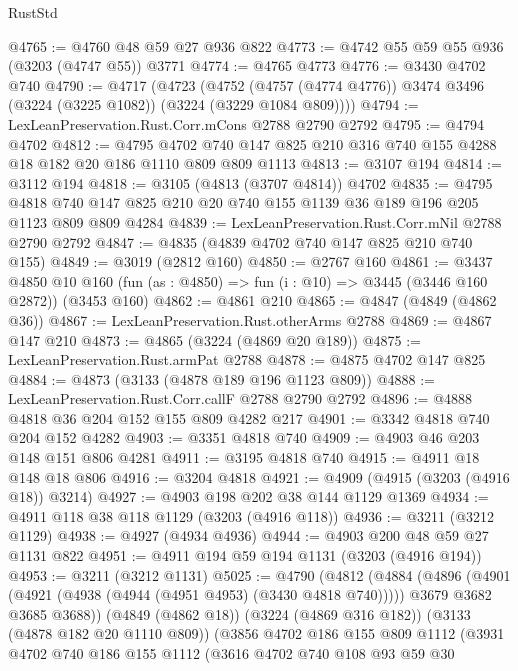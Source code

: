 \begin{lexlean}{RustStd}
\begin{coremodule}
@4765 := @4760 @48 @59 @27 @936 @822
@4773 := @4742 @55 @59 @55 @936 (@3203 (@4747 @55)) @3771
@4774 := @4765 @4773
@4776 := @3430 @4702 @740
@4790 := @4717
    (@4723
      (@4752 (@4757 (@4774 @4776)) @3474 @3496 (@3224 (@3225 @1082)) (@3224 (@3229 @1084 @809))))
@4794 := LexLeanPreservation.Rust.Corr.mCons @2788 @2790 @2792
@4795 := @4794 @4702
@4812 := @4795
    @4702
    @740
    @147
    @825
    @210
    @316
    @740
    @155
    @4288
    @18
    @182
    @20
    @186
    @1110
    @809
    @809
    @1113
@4813 := @3107 @194
@4814 := @3112 @194
@4818 := @3105 (@4813 (@3707 @4814)) @4702
@4835 := @4795
    @4818
    @740
    @147
    @825
    @210
    @20
    @740
    @155
    @1139
    @36
    @189
    @196
    @205
    @1123
    @809
    @809
    @4284
@4839 := LexLeanPreservation.Rust.Corr.mNil @2788 @2790 @2792
@4847 := @4835 (@4839 @4702 @740 @147 @825 @210 @740 @155)
@4849 := @3019 (@2812 @160)
@4850 := @2767 @160
@4861 := @3437
    @4850
    @10
    @160
    (fun (as : @4850) => fun (i : @10) => @3445 (@3446 @160 @2872))
    (@3453 @160)
@4862 := @4861 @210
@4865 := @4847 (@4849 (@4862 @36))
@4867 := LexLeanPreservation.Rust.otherArms @2788
@4869 := @4867 @147 @210
@4873 := @4865 (@3224 (@4869 @20 @189))
@4875 := LexLeanPreservation.Rust.armPat @2788
@4878 := @4875 @4702 @147 @825
@4884 := @4873 (@3133 (@4878 @189 @196 @1123 @809))
@4888 := LexLeanPreservation.Rust.Corr.callF @2788 @2790 @2792
@4896 := @4888 @4818 @36 @204 @152 @155 @809 @4282 @217
@4901 := @3342 @4818 @740 @204 @152 @4282
@4903 := @3351 @4818 @740
@4909 := @4903 @46 @203 @148 @151 @806 @4281
@4911 := @3195 @4818 @740
@4915 := @4911 @18 @148 @18 @806
@4916 := @3204 @4818
@4921 := @4909 (@4915 (@3203 (@4916 @18)) @3214)
@4927 := @4903 @198 @202 @38 @144 @1129 @1369
@4934 := @4911 @118 @38 @118 @1129 (@3203 (@4916 @118))
@4936 := @3211 (@3212 @1129)
@4938 := @4927 (@4934 @4936)
@4944 := @4903 @200 @48 @59 @27 @1131 @822
@4951 := @4911 @194 @59 @194 @1131 (@3203 (@4916 @194))
@4953 := @3211 (@3212 @1131)
@5025 := @4790
    (@4812
      (@4884
        (@4896
          (@4901 (@4921 (@4938 (@4944 (@4951 @4953) (@3430 @4818 @740)))))
          @3679
          @3682
          @3685
          @3688))
      (@4849 (@4862 @18))
      (@3224 (@4869 @316 @182))
      (@3133 (@4878 @182 @20 @1110 @809))
      (@3856
        @4702
        @186
        @155
        @809
        @1112
        (@3931
          @4702
          @740
          @186
          @155
          @1112
          (@3616
            @4702
            @740
            @108
            @93
            @59
            @30

\end{coremodule}
\end{lexlean}
